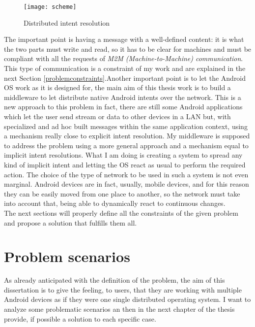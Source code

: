 \begin{figure}[h]
	\centering
	\texttt{[image: scheme]}
	\caption{Distributed intent resolution}
	\label{fig:3.1}
\end{figure}
The important point is having a message with a well-defined content: it is what the two parts must write and read, so it has to be clear for machines and must be compliant with all the requests of \textit{M2M (Machine-to-Machine) communication}. This type of communication is a constraint of my work and are explained in the next Section \ref{problemconstraints}.Another important point is to let the Android OS work as it is designed for, the main aim of this thesis work is to build a middleware to let distribute native Android intents over the network. This is a new approach to this problem in fact, there are still some Android applications which let the user send stream or data to other devices in a LAN but, with specialized and ad hoc built messages within the same application context, using a mechanism really close to explicit intent resolution. My middleware is supposed to address the problem using a more general approach and a mechanism equal to implicit intent resolutions. What I am doing is creating a system to spread any kind of implicit intent and letting the OS react as usual to perform the required action.
The choice of the type of network to be used in such a system is not even marginal. Android devices are in fact, usually, mobile devices, and for this reason they can be easily moved from one place to another, so the network must take into account that, being able to dynamically react to continuous changes.\\
The next sections will properly define all the constraints of the given problem and propose a solution that fulfills them all.
\section{Problem scenarios}
As already anticipated with the definition of the problem,  the aim of this dissertation is to give the feeling, to users, that they are working with multiple Android devices as if they were one single distributed operating system. I want to analyze some problematic scenarios an then in the next chapter of the thesis provide, if possible a solution to each specific case.

